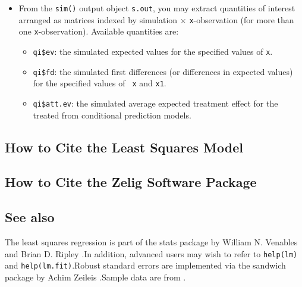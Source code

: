 \begin{itemize}
\item From the {\tt sim()} output object {\tt s.out}, you may extract
  quantities of interest arranged as matrices indexed by simulation
  $\times$ {\tt x}-observation (for more than one {\tt x}-observation).
  Available quantities are:

   \begin{itemize}
   \item {\tt qi\$ev}: the simulated expected values for the specified
     values of {\tt x}.
   \item {\tt qi\$fd}:  the simulated first differences (or
     differences in expected values) for the specified values of {\tt
       x} and {\tt x1}. 
   \item {\tt qi\$att.ev}: the simulated average expected treatment
     effect for the treated from conditional prediction models.  
   \end{itemize}
\end{itemize}

\subsection*{How to Cite the Least Squares Model}

\subsection*{How to Cite the Zelig Software Package}
\CiteZelig


\subsection* {See also}
The least squares regression is part of the stats package by William N.
Venables and Brian D. Ripley \citep{VenRip02}.In addition, advanced users may wish to refer to \texttt{help(lm)} and \texttt{help(lm.fit)}.Robust standard errors are implemented via the sandwich package by Achim Zeileis \citep{Zeileis04}.Sample data are from \cite{KinTomWit00}.
